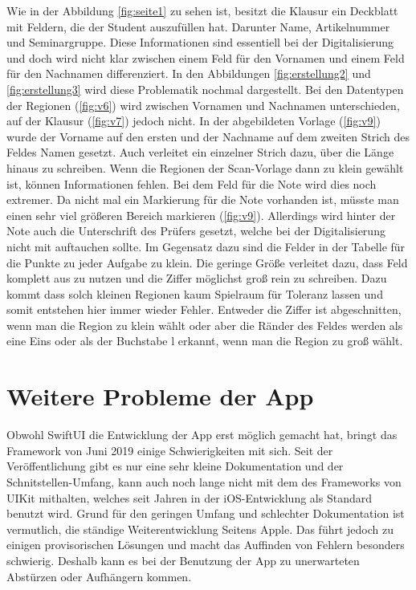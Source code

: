 \documentclass[nomenclature, oneside, 150]{HSMW-Thesis}
\begin{document}
		Wie in der Abbildung \ref{fig:seite1} zu sehen ist, besitzt die Klausur ein Deckblatt mit Feldern, die der Student auszufüllen hat. Darunter Name, Artikelnummer und Seminargruppe. Diese Informationen sind essentiell bei der Digitalisierung und doch wird nicht klar zwischen einem Feld für den Vornamen und einem Feld für den Nachnamen differenziert. In den Abbildungen \ref{fig:erstellung2} und \ref{fig:erstellung3} wird diese Problematik nochmal dargestellt. Bei den Datentypen der Regionen (\ref{fig:v6}) wird zwischen Vornamen und Nachnamen unterschieden, auf der Klausur (\ref{fig:v7}) jedoch nicht. In der abgebildeten Vorlage (\ref{fig:v9}) wurde der Vorname auf den ersten und der Nachname auf dem zweiten Strich des Feldes Namen gesetzt. Auch verleitet ein einzelner Strich dazu, über die Länge hinaus zu schreiben. Wenn die Regionen der Scan-Vorlage dann zu klein gewählt ist, können Informationen fehlen. Bei dem Feld für die Note wird dies noch extremer. Da nicht mal ein Markierung für die Note vorhanden ist, müsste man einen sehr viel größeren Bereich markieren (\ref{fig:v9}). Allerdings wird hinter der Note auch die Unterschrift des Prüfers gesetzt, welche bei der Digitalisierung nicht mit auftauchen sollte. Im Gegensatz dazu sind die Felder in der Tabelle für die Punkte zu jeder Aufgabe zu klein. Die geringe Größe verleitet dazu, dass Feld komplett aus zu nutzen und die Ziffer möglichst groß rein zu schreiben. Dazu kommt dass solch kleinen Regionen kaum Spielraum für Toleranz lassen und somit entstehen hier immer wieder Fehler. Entweder die Ziffer ist abgeschnitten, wenn man die Region zu klein wählt oder aber die Ränder des Feldes werden als eine Eins oder als der Buchstabe l erkannt, wenn man die Region zu groß wählt.

	\section{Weitere Probleme der App}
		Obwohl SwiftUI die Entwicklung der App erst möglich gemacht hat, bringt das Framework von Juni 2019 einige Schwierigkeiten mit sich. Seit der Veröffentlichung gibt es nur eine sehr kleine Dokumentation und der Schnitstellen-Umfang, kann auch noch lange nicht mit dem des Frameworks von UIKit mithalten, welches seit Jahren in der iOS-Entwicklung als Standard benutzt wird. Grund für den geringen Umfang und schlechter Dokumentation ist vermutlich, die ständige Weiterentwicklung Seitens Apple. Das führt jedoch zu einigen provisorischen Lösungen und macht das Auffinden von Fehlern besonders schwierig. Deshalb kann es bei der Benutzung der App zu unerwarteten Abstürzen oder Aufhängern kommen.
		
\end{document}
